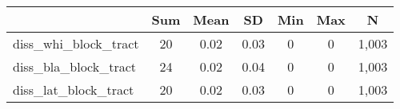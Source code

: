{
\def\sym#1{\ifmmode^{#1}\else\(^{#1}\)\fi}
\begin{tabular}{l*{1}{cccccc}}
\hline\hline
                    &         Sum&        Mean&          SD&         Min&         Max&           N\\
\hline
diss\_whi\_block\_tract&          20&        0.02&        0.03&           0&           0&       1,003\\
diss\_bla\_block\_tract&          24&        0.02&        0.04&           0&           0&       1,003\\
diss\_lat\_block\_tract&          20&        0.02&        0.03&           0&           0&       1,003\\
\hline\hline
\end{tabular}
}
